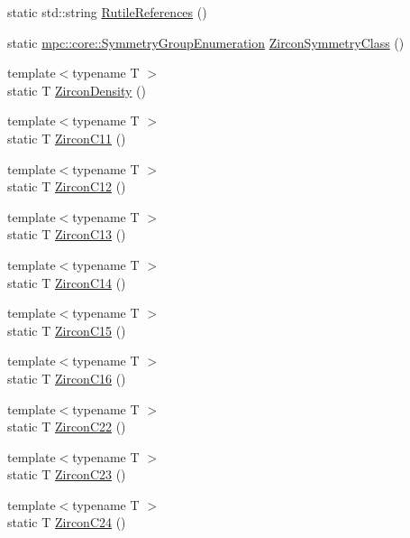 \begin{DoxyCompactItemize}
\item 
static std\+::string \mbox{\hyperlink{namespacempc_1_1data_a2506808b8bb81b467d1ef68479226386}{Rutile\+References}} ()
\item 
static \mbox{\hyperlink{namespacempc_1_1core_a9d979684062547055a0ef5c13077bad8}{mpc\+::core\+::\+Symmetry\+Group\+Enumeration}} \mbox{\hyperlink{namespacempc_1_1data_ad4ffddb1bd1cb59ed7a259e300176198}{Zircon\+Symmetry\+Class}} ()
\item 
{\footnotesize template$<$typename T $>$ }\\static T \mbox{\hyperlink{namespacempc_1_1data_ab0ba4bb3c2e97dc416606ce9d3641a9f}{Zircon\+Density}} ()
\item 
{\footnotesize template$<$typename T $>$ }\\static T \mbox{\hyperlink{namespacempc_1_1data_a6819bf2cb3ee1b7ee7f50113e3900ba5}{Zircon\+C11}} ()
\item 
{\footnotesize template$<$typename T $>$ }\\static T \mbox{\hyperlink{namespacempc_1_1data_af6fbaef32aa553dab4e52f35a5ecf88d}{Zircon\+C12}} ()
\item 
{\footnotesize template$<$typename T $>$ }\\static T \mbox{\hyperlink{namespacempc_1_1data_a86a9861b805ec348a9c7a4c3cf1b25e8}{Zircon\+C13}} ()
\item 
{\footnotesize template$<$typename T $>$ }\\static T \mbox{\hyperlink{namespacempc_1_1data_ad928eb73775dbcd33260088332afb227}{Zircon\+C14}} ()
\item 
{\footnotesize template$<$typename T $>$ }\\static T \mbox{\hyperlink{namespacempc_1_1data_a715689f6b0cd2d9576aafcbe04a00807}{Zircon\+C15}} ()
\item 
{\footnotesize template$<$typename T $>$ }\\static T \mbox{\hyperlink{namespacempc_1_1data_ade008832ffd45882b66bb58f0d61daea}{Zircon\+C16}} ()
\item 
{\footnotesize template$<$typename T $>$ }\\static T \mbox{\hyperlink{namespacempc_1_1data_ad33456d557784b521d2d776ec4678353}{Zircon\+C22}} ()
\item 
{\footnotesize template$<$typename T $>$ }\\static T \mbox{\hyperlink{namespacempc_1_1data_a564edd28f8ffeb09b13308cc4ca2bfd2}{Zircon\+C23}} ()
\item 
{\footnotesize template$<$typename T $>$ }\\static T \mbox{\hyperlink{namespacempc_1_1data_a92f6706c527b046775b3092a1b56b71a}{Zircon\+C24}} ()

\end{DoxyCompactItemize}
